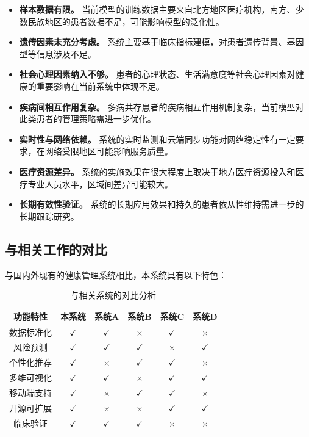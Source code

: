\begin{itemize}[itemindent=2em]
\item \textbf{样本数据有限。} 当前模型的训练数据主要来自北方地区医疗机构，南方、少数民族地区的患者数据不足，可能影响模型的泛化性。

\item \textbf{遗传因素未充分考虑。} 系统主要基于临床指标建模，对患者遗传背景、基因型等信息涉及不足。

\item \textbf{社会心理因素纳入不够。} 患者的心理状态、生活满意度等社会心理因素对健康的重要影响在当前系统中体现不足。

\item \textbf{疾病间相互作用复杂。} 多病共存患者的疾病相互作用机制复杂，当前模型对此类患者的管理策略需进一步优化。

\item \textbf{实时性与网络依赖。} 系统的实时监测和云端同步功能对网络稳定性有一定要求，在网络受限地区可能影响服务质量。

\item \textbf{医疗资源差异。} 系统的实施效果在很大程度上取决于地方医疗资源投入和医疗专业人员水平，区域间差异可能较大。

\item \textbf{长期有效性验证。} 系统的长期应用效果和持久的患者依从性维持需进一步的长期跟踪研究。

\end{itemize}

\subsection{与相关工作的对比}

与国内外现有的健康管理系统相比，本系统具有以下特色：

\begin{table}[H]
  \centering
  \caption{与相关系统的对比分析}
  \label{tab:comparison}
  \begin{tabularx}{\textwidth}{CCCCCC}
    \toprule
    功能特性 & 本系统 & 系统A & 系统B & 系统C & 系统D \\
    \midrule
    数据标准化 & $\checkmark$ & $\checkmark$ & $\times$ & $\checkmark$ & $\times$ \\
    风险预测 & $\checkmark$ & $\checkmark$ & $\checkmark$ & $\times$ & $\checkmark$ \\
    个性化推荐 & $\checkmark$ & $\times$ & $\checkmark$ & $\checkmark$ & $\times$ \\
    多维可视化 & $\checkmark$ & $\checkmark$ & $\times$ & $\checkmark$ & $\checkmark$ \\
    移动端支持 & $\checkmark$ & $\times$ & $\checkmark$ & $\checkmark$ & $\times$ \\
    开源可扩展 & $\checkmark$ & $\times$ & $\times$ & $\checkmark$ & $\checkmark$ \\
    临床验证 & $\checkmark$ & $\checkmark$ & $\checkmark$ & $\times$ & $\times$ \\
    \bottomrule
  \end{tabularx}
\end{table}


